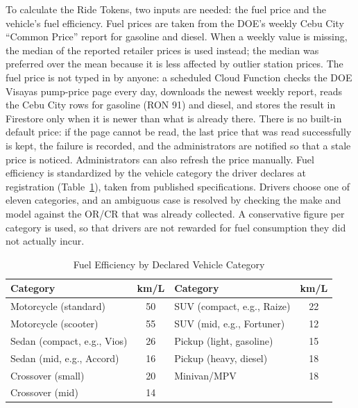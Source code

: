 To calculate the Ride Tokens, two inputs are needed: the fuel price and the vehicle's fuel efficiency. Fuel prices are taken from the DOE's weekly Cebu City ``Common Price'' report for gasoline and diesel. When a weekly value is missing, the median of the reported retailer prices is used instead; the median was preferred over the mean because it is less affected by outlier station prices. The fuel price is not typed in by anyone: a scheduled Cloud Function checks the DOE Visayas pump-price page every day, downloads the newest weekly report, reads the Cebu City rows for gasoline (RON 91) and diesel, and stores the result in Firestore only when it is newer than what is already there. There is no built-in default price: if the page cannot be read, the last price that was read successfully is kept, the failure is recorded, and the administrators are notified so that a stale price is noticed. Administrators can also refresh the price manually. Fuel efficiency is standardized by the vehicle category the driver declares at registration (Table~\ref{tab:efficiency}), taken from published specifications. Drivers choose one of eleven categories, and an ambiguous case is resolved by checking the make and model against the OR/CR that was already collected. A conservative figure per category is used, so that drivers are not rewarded for fuel consumption they did not actually incur.

\begin{table}[htbp]
    \centering
    \caption{Fuel Efficiency by Declared Vehicle Category}
    \label{tab:efficiency}
    \small
    \renewcommand{\arraystretch}{1.2}
    \begin{tabular}{|l|c|l|c|}
        \hline
        \textbf{Category} & \textbf{km/L} & \textbf{Category} & \textbf{km/L} \\
        \hline
        Motorcycle (standard) & 50 & SUV (compact, e.g., Raize) & 22 \\
        Motorcycle (scooter) & 55 & SUV (mid, e.g., Fortuner) & 12 \\
        Sedan (compact, e.g., Vios) & 26 & Pickup (light, gasoline) & 15 \\
        Sedan (mid, e.g., Accord) & 16 & Pickup (heavy, diesel) & 18 \\
        Crossover (small) & 20 & Minivan/MPV & 18 \\
        Crossover (mid) & 14 & & \\
        \hline
    \end{tabular}
\end{table}

